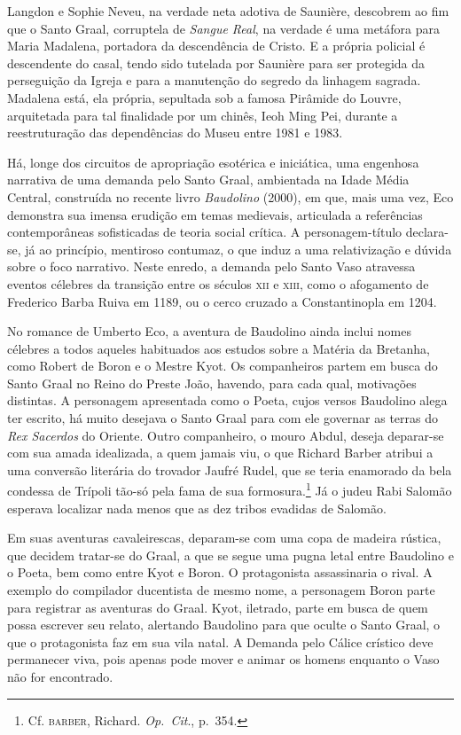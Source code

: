 Langdon e Sophie Neveu, na verdade neta adotiva de Saunière, descobrem
ao fim que o Santo Graal, corruptela de \textit{Sangue Real}, na
verdade é uma metáfora para Maria Madalena, portadora da descendência
de Cristo. E a própria policial é descendente do casal, tendo sido
tutelada por Saunière para ser protegida da perseguição da Igreja e
para a manutenção do segredo da linhagem sagrada. Madalena está, ela
própria, sepultada sob a famosa Pirâmide do Louvre, arquitetada para
tal finalidade por um chinês, Ieoh Ming Pei, durante a
reestruturação das dependências do Museu entre 1981 e 1983. 

Há, longe dos circuitos de apropriação esotérica e iniciática, uma
engenhosa narrativa de uma demanda pelo Santo Graal, ambientada na
Idade Média Central, construída no recente livro \textit{Baudolino}
(2000), em que, mais uma vez, Eco demonstra sua imensa erudição em
temas medievais, articulada a referências contemporâneas sofisticadas
de teoria social crítica. A personagem-título declara-se, já ao
princípio, mentiroso contumaz, o que induz a uma relativização e dúvida
sobre o foco narrativo. Neste enredo, a demanda pelo Santo Vaso
atravessa eventos célebres da transição entre os séculos \textsc{xii} e \textsc{xiii},
como o afogamento de Frederico Barba Ruiva em 1189, ou o cerco cruzado
a Constantinopla em 1204. 

No romance de Umberto Eco, a aventura de Baudolino ainda inclui nomes
célebres a todos aqueles habituados aos estudos sobre a Matéria da
Bretanha, como Robert de Boron e o Mestre Kyot. Os companheiros partem
em busca do Santo Graal no Reino do Preste João, havendo, para cada
qual, motivações distintas. A personagem apresentada como o Poeta,
cujos versos Baudolino alega ter escrito, há muito desejava o Santo
Graal para com ele governar as terras do \textit{Rex Sacerdos} do
Oriente. Outro companheiro, o mouro Abdul, deseja deparar-se com sua
amada idealizada, a quem jamais viu, o que Richard Barber atribui a uma
conversão literária do trovador Jaufré Rudel, que se teria enamorado da
bela condessa de Trípoli tão-só pela fama de sua formosura.\footnote{
Cf. \textsc{barber}, Richard. \textit{Op.~Cit}., p.~354.} Já o judeu Rabi
Salomão esperava localizar nada menos que as dez tribos evadidas de
Salomão. 

Em suas aventuras cavaleirescas, deparam-se com uma copa de madeira
rústica, que decidem tratar-se do Graal, a que se segue uma pugna letal
entre Baudolino e o Poeta, bem como entre Kyot e Boron. O protagonista
assassinaria o rival. A exemplo do compilador ducentista de mesmo nome,
a personagem Boron parte para registrar as aventuras do Graal. Kyot,
iletrado, parte em busca de quem possa escrever seu relato, alertando
Baudolino para que oculte o Santo Graal, o que o protagonista faz em
sua vila natal. A Demanda pelo Cálice crístico deve permanecer viva,
pois apenas pode mover e animar os homens enquanto o Vaso não for
encontrado. 

